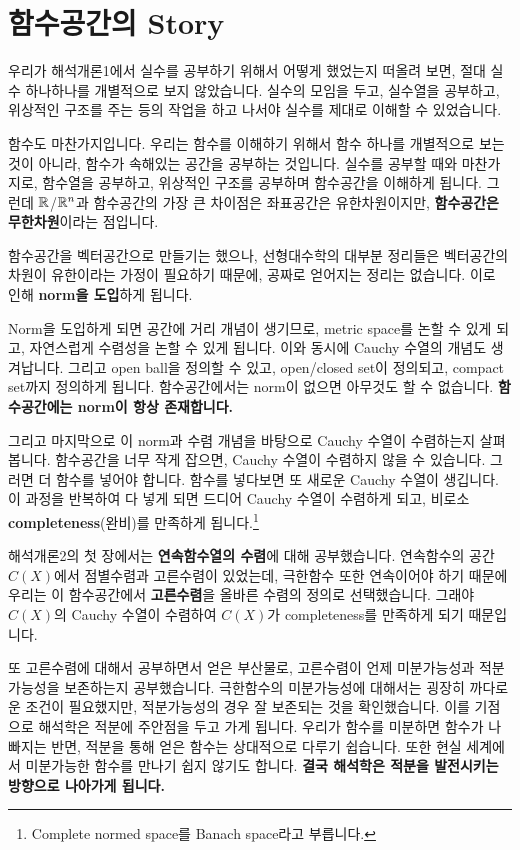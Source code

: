 \section*{함수공간의 Story}

우리가 해석개론1에서 실수를 공부하기 위해서 어떻게 했었는지 떠올려 보면, 절대 실수 하나하나를 개별적으로 보지 않았습니다. 실수의 모임을 두고, 실수열을 공부하고, 위상적인 구조를 주는 등의 작업을 하고 나서야 실수를 제대로 이해할 수 있었습니다.

함수도 마찬가지입니다. 우리는 함수를 이해하기 위해서 함수 하나를 개별적으로 보는 것이 아니라, 함수가 속해있는 공간을 공부하는 것입니다. 실수를 공부할 때와 마찬가지로, 함수열을 공부하고, 위상적인 구조를 공부하며 함수공간을 이해하게 됩니다. 그런데 \(\mathbb{R}\)/\(\mathbb{R}^n\)과 함수공간의 가장 큰 차이점은 좌표공간은 유한차원이지만, \textbf{함수공간은 무한차원}이라는 점입니다.

함수공간을 벡터공간으로 만들기는 했으나, 선형대수학의 대부분 정리들은 벡터공간의 차원이 유한이라는 가정이 필요하기 때문에, 공짜로 얻어지는 정리는 없습니다. 이로 인해 \textbf{norm을 도입}하게 됩니다.

Norm을 도입하게 되면 공간에 거리 개념이 생기므로, metric space를 논할 수 있게 되고, 자연스럽게 수렴성을 논할 수 있게 됩니다. 이와 동시에 Cauchy 수열의 개념도 생겨납니다. 그리고 open ball을 정의할 수 있고, open/closed set이 정의되고, compact set까지 정의하게 됩니다. 함수공간에서는 norm이 없으면 아무것도 할 수 없습니다. \textbf{함수공간에는 norm이 항상 존재합니다.}

그리고 마지막으로 이 norm과 수렴 개념을 바탕으로 Cauchy 수열이 수렴하는지 살펴봅니다. 함수공간을 너무 작게 잡으면, Cauchy 수열이 수렴하지 않을 수 있습니다. 그러면 더 함수를 넣어야 합니다. 함수를 넣다보면 또 새로운 Cauchy 수열이 생깁니다. 이 과정을 반복하여 다 넣게 되면 드디어 Cauchy 수열이 수렴하게 되고, 비로소 \textbf{completeness}(완비)를 만족하게 됩니다.\footnote{Complete normed space를 Banach space라고 부릅니다.}

해석개론2의 첫 장에서는 \textbf{연속함수열의 수렴}에 대해 공부했습니다. 연속함수의 공간 \(C(X)\)에서 점별수렴과 고른수렴이 있었는데, 극한함수 또한 연속이어야 하기 때문에 우리는 이 함수공간에서 \textbf{고른수렴}을 올바른 수렴의 정의로 선택했습니다. 그래야 \(C(X)\)의 Cauchy 수열이 수렴하여 \(C(X)\)가 completeness를 만족하게 되기 때문입니다.

또 고른수렴에 대해서 공부하면서 얻은 부산물로, 고른수렴이 언제 미분가능성과 적분가능성을 보존하는지 공부했습니다. 극한함수의 미분가능성에 대해서는 굉장히 까다로운 조건이 필요했지만, 적분가능성의 경우 잘 보존되는 것을 확인했습니다. 이를 기점으로 해석학은 적분에 주안점을 두고 가게 됩니다. 우리가 함수를 미분하면 함수가 나빠지는 반면, 적분을 통해 얻은 함수는 상대적으로 다루기 쉽습니다. 또한 현실 세계에서 미분가능한 함수를 만나기 쉽지 않기도 합니다. \textbf{결국 해석학은 적분을 발전시키는 방향으로 나아가게 됩니다.}

